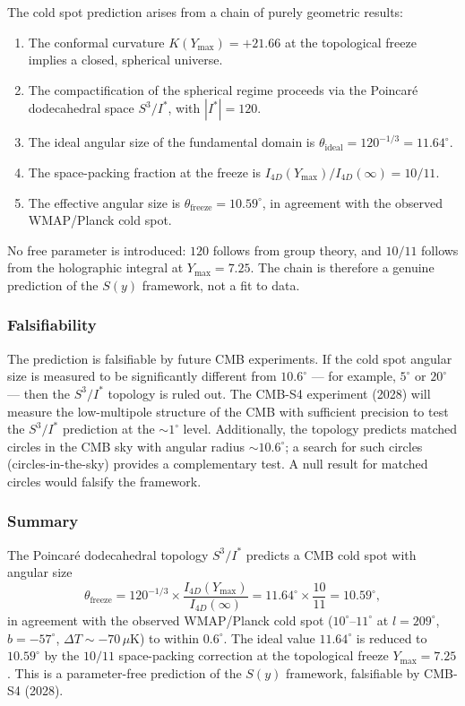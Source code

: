 \documentclass[a4paper,1pt,oneside,openany]{book}
\begin{document}
The cold spot prediction arises from a chain of purely geometric results:
\begin{enumerate}
\item The conformal curvature $K(Y_{\max}) = +21.66$ at the topological freeze implies a closed, spherical universe.
\item The compactification of the spherical regime proceeds via the Poincar\'e dodecahedral space $S^3/I^*$, with $|I^*| = 120$.
\item The ideal angular size of the fundamental domain is $\theta_{\mathrm{ideal}} = 120^{-1/3} = 11.64^\circ$.
\item The space-packing fraction at the freeze is $I_{4D}(Y_{\max})/I_{4D}(\infty) = 10/11$.
\item The effective angular size is $\theta_{\mathrm{freeze}} = 10.59^\circ$, in agreement with the observed WMAP/Planck cold spot.
\end{enumerate}
No free parameter is introduced: $120$ follows from group theory, and $10/11$ follows from the holographic integral at $Y_{\max} = 7.25$. The chain is therefore a genuine prediction of the $S(y)$ framework, not a fit to data.

\subsubsection{Falsifiability}

The prediction is falsifiable by future CMB experiments. If the cold spot angular size is measured to be significantly different from $10.6^\circ$ — for example, $5^\circ$ or $20^\circ$ — then the $S^3/I^*$ topology is ruled out. The CMB-S4 experiment (2028) will measure the low-multipole structure of the CMB with sufficient precision to test the $S^3/I^*$ prediction at the $\sim 1^\circ$ level. Additionally, the topology predicts matched circles in the CMB sky with angular radius $\sim 10.6^\circ$; a search for such circles (circles-in-the-sky) provides a complementary test. A null result for matched circles would falsify the framework.

\subsubsection{Summary}

The Poincar\'e dodecahedral topology $S^3/I^*$ predicts a CMB cold spot with angular size
\begin{equation}
\boxed{\theta_{\mathrm{freeze}} = 120^{-1/3} \times \frac{I_{4D}(Y_{\max})}{I_{4D}(\infty)} = 11.64^\circ \times \frac{10}{11} = 10.59^\circ,}
\label{eq:coldspot-summary}
\end{equation}
in agreement with the observed WMAP/Planck cold spot ($10^\circ$--$11^\circ$ at $l = 209^\circ$, $b = -57^\circ$, $\Delta T \sim -70\,\mu\mathrm{K}$) to within $0.6^\circ$. The ideal value $11.64^\circ$ is reduced to $10.59^\circ$ by the $10/11$ space-packing correction at the topological freeze $Y_{\max} = 7.25$. This is a parameter-free prediction of the $S(y)$ framework, falsifiable by CMB-S4 (2028).
\end{document}
